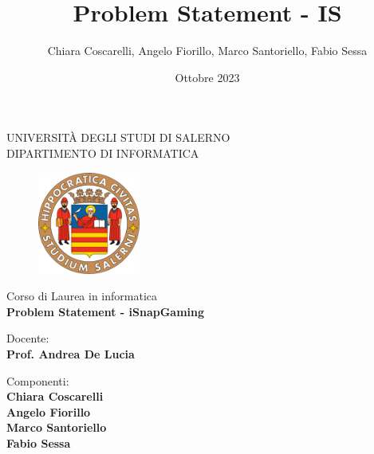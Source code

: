 \documentclass[12pt, a4paper, oneside]{book}
\title{Problem Statement - IS}
\author{Chiara Coscarelli, Angelo Fiorillo, Marco Santoriello, Fabio Sessa}
\date{Ottobre 2023}
\begin{document}
    \begin{titlepage}
        \begin{center}
            \LARGE{\uppercase{Università degli Studi di Salerno}}\\
            \vspace{5mm}
            \uppercase{\normalsize Dipartimento di Informatica}\\
        \end{center}
        \begin{figure}[H]
            \centering
            \includegraphics[width=0.3\textwidth]{img/logo_unisa.png}
        \end{figure}

        \begin{center}
            \normalsize{ Corso di Laurea in informatica }\\
            \vspace{5mm}
            {\LARGE{\bf Problem Statement - iSnapGaming }}\\
            \vspace{10mm}
        \end{center}

        \vspace{15mm}
        \noindent
        \begin{minipage}[t]{0.47\textwidth}
        {\large{ Docente:\\\bf  Prof. Andrea De Lucia}}
            \vspace{12mm}\\
        \end{minipage}
        \hfill
        \begin{minipage}[t]{0.4\textwidth}\raggedright
        {\large{Componenti: \\ \bf Chiara Coscarelli\\Angelo Fiorillo\\Marco Santoriello\\Fabio Sessa}}
        \end{minipage}

        \vspace{20mm}

        \vspace{50mm}

    \end{titlepage}
\end{document}
